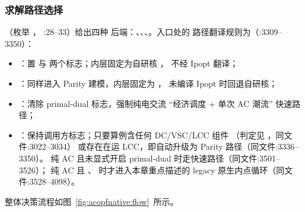 \subsubsection*{求解路径选择}
（枚举 ，
:28--33）给出四种
后端：、、、。入口处的
路径翻译规则为（:3309--3350）：
\begin{itemize}
  \item {}：置  与 
        两个标志；内层固定为自研核 ，
        不经 Ipopt 翻译；
  \item {}：同样进入 Parity 建模，内层固定为 ，
        未编译 Ipopt 时回退自研核；
  \item {}：清除 primal-dual 标志，强制纯电交流
        ``经济调度 + 单次 AC 潮流'' 快速路径；
  \item {}：保持调用方标志；只要算例含任何 DC/VSC/LCC 组件
        （判定见 ，同文件:3022--3034）
        或存在在运 LCC，即自动升级为 Parity 路径（同文件:3336--3350）。
        纯 AC 且未显式开启 primal-dual 时走快速路径（同文件:3501--3526）；
        纯 AC 且 、
        时才进入本章重点描述的 legacy 原生内点循环（同文件:3528--4098）。
\end{itemize}
整体决策流程如图~\ref{fig:acopfnative:flow}~所示。

